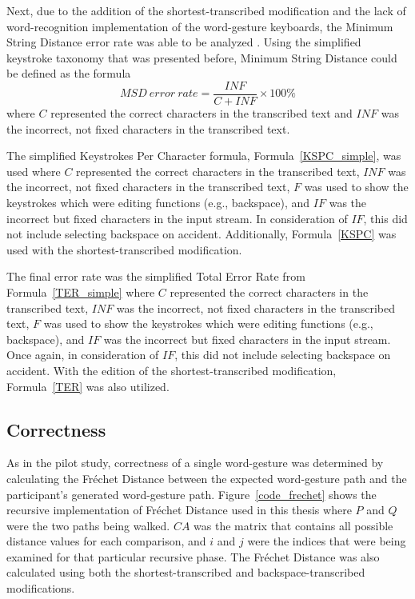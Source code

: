 Next, due to the addition of the shortest-transcribed modification and the lack of word-recognition implementation of the word-gesture keyboards, the Minimum String Distance error rate was able to be analyzed \cite{ref_error_rates}. Using the simplified keystroke taxonomy that was presented before, Minimum String Distance could be defined as the formula
\begin{equation} \label{pilot_ter}
	MSD\ error\ rate = \frac{INF}{C + INF} \times 100\%
\end{equation}
where $C$ represented the correct characters in the transcribed text and $INF$ was the incorrect, not fixed characters in the transcribed text.

The simplified Keystrokes Per Character formula, Formula~\ref{KSPC_simple}, was used where $C$ represented the correct characters in the transcribed text, $INF$ was the incorrect, not fixed characters in the transcribed text, $F$ was used to show the keystrokes which were editing functions (e.g., backspace), and $IF$ was the incorrect but fixed characters in the input stream. In consideration of $IF$, this did not include selecting backspace on accident. Additionally, Formula~\ref{KSPC} was used with the shortest-transcribed modification.

The final error rate was the simplified Total Error Rate from Formula~\ref{TER_simple} where $C$ represented the correct characters in the transcribed text, $INF$ was the incorrect, not fixed characters in the transcribed text, $F$ was used to show the keystrokes which were editing functions (e.g., backspace), and $IF$ was the incorrect but fixed characters in the input stream.  Once again, in consideration of $IF$, this did not include selecting backspace on accident. With the edition of the shortest-transcribed modification, Formula~\ref{TER} was also utilized.

\subsection{Correctness} \label{final_correctness}
As in the pilot study, correctness of a single word-gesture was determined by calculating the Fr\'echet Distance between the expected word-gesture path and the participant's generated word-gesture path. Figure~\ref{code_frechet} shows the recursive implementation of Fr\'echet Distance used in this thesis where $P$ and $Q$ were the two paths being walked. $CA$ was the matrix that contains all possible distance values for each comparison, and $i$ and $j$ were the indices that were being examined for that particular recursive phase. The Fr\'echet Distance was also calculated using both the shortest-transcribed and backspace-transcribed modifications.

